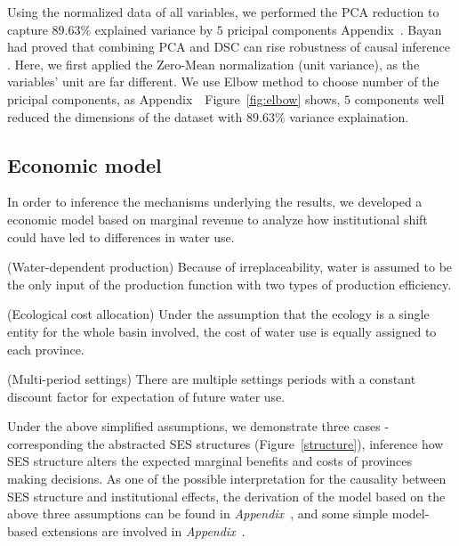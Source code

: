 Using the normalized data of all variables, we performed the PCA reduction to capture $89.63\%$ explained variance by $5$ pricipal components Appendix~. Bayan had proved that combining PCA and DSC can rise robustness of causal inference \cite{bayani2021}. Here, we first applied the Zero-Mean normalization (unit variance), as the variables' unit are far different. We use Elbow method to choose number of the pricipal components, as Appendix~~Figure~\ref{fig:elbow} shows, $5$ components well reduced the dimensions of the dataset with $89.63\%$ variance explaination.

\subsection{Economic model}\label{sec:model}
In order to inference the mechanisms underlying the results, we developed a economic model based on marginal revenue to analyze how institutional shift could have led to differences in water use.

\begin{ass}
    (Water-dependent production) Because of irreplaceability, water is assumed to be the only input of the production function with two types of production efficiency.
\end{ass}

\begin{ass}
    (Ecological cost allocation) Under the assumption that the ecology is a single entity for the whole basin involved, the cost of water use is equally assigned to each province.
\end{ass}

\begin{ass}
    (Multi-period settings) There are multiple settings periods with a constant discount factor for expectation of future water use.
\end{ass}

Under the above simplified assumptions, we demonstrate three cases -corresponding the abstracted SES structures (Figure~\ref{structure}), inference how SES structure alters the expected marginal benefits and costs of provinces making decisions.
As one of the possible interpretation for the causality between SES structure and institutional effects, the derivation of the model based on the above three assumptions can be found in \textit{Appendix~}, and some simple model-based extensions are involved in \textit{Appendix~}.

